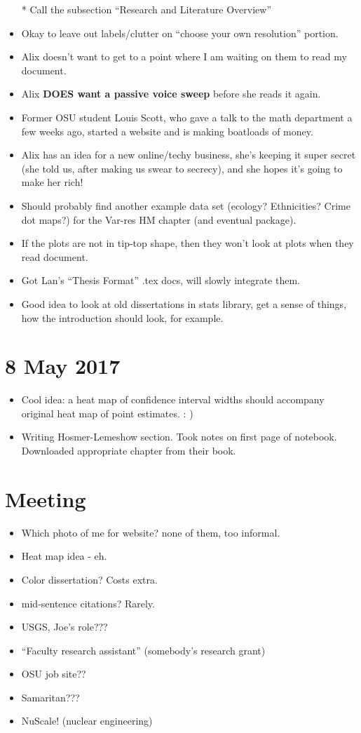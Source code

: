 \documentclass{article}
\begin{document}
\begin{itemize}
* Call the subsection ``Research and Literature Overview''
\item Okay to leave out labels/clutter on ``choose your own resolution'' portion.
\item Alix doesn't want to get to a point where I am waiting on them to read my document.
\item Alix {\bf DOES want a passive voice sweep} before she reads it again.
\item Former OSU student Louis Scott, who gave a talk to the math department a few weeks ago, started a website and is making boatloads of money.
\item Alix has an idea for a new online/techy business, she's keeping it super secret (she told us, after making us swear to secrecy), and she hopes it's going to make her rich!
\item Should probably find another example data set (ecology? Ethnicities? Crime dot maps?) for the Var-res HM chapter (and eventual package).
\item If the plots are not in tip-top shape, then they won't look at plots when they read document.
\item Got Lan's ``Thesis Format'' .tex docs, will slowly integrate them.
\item Good idea to look at old dissertations in stats library, get a sense of things, how the introduction should look, for example.
\end{itemize}

\section{8 May 2017}
\begin{itemize}
\item Cool idea: a heat map of confidence interval widths should accompany original heat map of point estimates. : )
\item Writing Hosmer-Lemeshow section. Took notes on first page of notebook. Downloaded appropriate chapter from their book.
\end{itemize}

\section{Meeting}
\begin{itemize}
\item Which photo of me for website? none of them, too informal.
\item Heat map idea - eh.
\item Color dissertation? Costs extra.
\item mid-sentence citations? Rarely.
\item USGS, Joe's role???
\item ``Faculty research assistant'' (somebody's research grant)
\item OSU job site??
\item Samaritan???
\item NuScale! (nuclear engineering)
\end{itemize}
\end{document}
